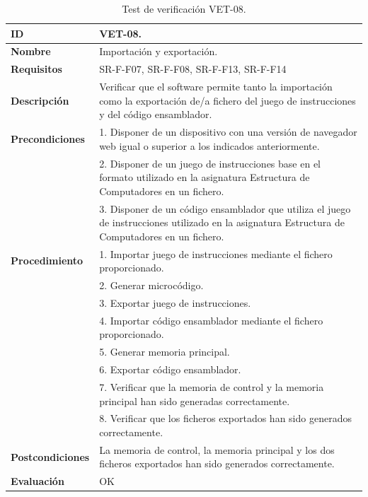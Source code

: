 \begin{center}
\begin{table}[htb]
\centering
\caption{Test de verificación VET-08.}
\begin{tabular}{@{}p{2.5cm} p{13cm}@{}} 
\toprule
\textbf{ID} 					& VET-08. \\
\midrule
\textbf{Nombre} 				& Importación y exportación. \\
\midrule
\textbf{Requisitos} 		& SR-F-F07, SR-F-F08, SR-F-F13, SR-F-F14\\
\midrule
\textbf{Descripción} 		& Verificar que el software permite tanto la importación como la exportación de/a fichero del juego de instrucciones y del código ensamblador. \\
\midrule
\textbf{Precondiciones}		& 1. Disponer de un dispositivo con una versión de navegador web igual o superior a los indicados anteriormente. \\
											& 2. Disponer de un juego de instrucciones base en el formato utilizado en la asignatura Estructura de Computadores en un fichero. \\
											& 3. Disponer de un código ensamblador que utiliza el juego de instrucciones utilizado en la asignatura Estructura de Computadores en un fichero. \\
\midrule
\textbf{Procedimiento}		& 1. Importar juego de instrucciones mediante el fichero proporcionado.\\
											& 2. Generar microcódigo.\\
											& 3. Exportar juego de instrucciones.\\
											& 4. Importar código ensamblador mediante el fichero proporcionado.\\
											& 5. Generar memoria principal.\\
											& 6. Exportar código ensamblador.\\
											& 7. Verificar que la memoria de control y la memoria principal han sido generadas correctamente.\\
											& 8. Verificar que los ficheros exportados han sido generados correctamente.\\
\midrule
\textbf{Postcondiciones} 		&  La memoria de control, la memoria principal y los dos ficheros exportados han sido generados correctamente.\\
\midrule
\textbf{Evaluación} 			& OK \\
\bottomrule
\end{tabular}
\label{tab:vet08}
\end{table}
\end{center}

